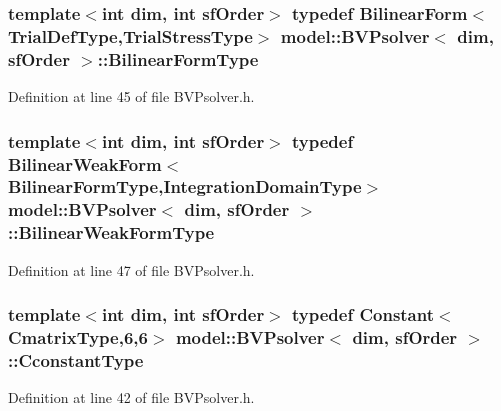 \subsubsection[{Bilinear\+Form\+Type}]{\setlength{\rightskip}{0pt plus 5cm}template$<$int dim, int sf\+Order$>$ typedef {\bf Bilinear\+Form}$<${\bf Trial\+Def\+Type},{\bf Trial\+Stress\+Type}$>$ {\bf model\+::\+B\+V\+Psolver}$<$ {\bf dim}, sf\+Order $>$\+::{\bf Bilinear\+Form\+Type}}\label{classmodel_1_1_b_v_psolver_abf2cbb433fe3755ad102b97e8c0e5797}


Definition at line 45 of file B\+V\+Psolver.\+h.

\hypertarget{classmodel_1_1_b_v_psolver_a06f36ccb87e0ec560ed0f8820527e8a5}{}
\subsubsection[{Bilinear\+Weak\+Form\+Type}]{\setlength{\rightskip}{0pt plus 5cm}template$<$int dim, int sf\+Order$>$ typedef {\bf Bilinear\+Weak\+Form}$<${\bf Bilinear\+Form\+Type},{\bf Integration\+Domain\+Type}$>$ {\bf model\+::\+B\+V\+Psolver}$<$ {\bf dim}, sf\+Order $>$\+::{\bf Bilinear\+Weak\+Form\+Type}}\label{classmodel_1_1_b_v_psolver_a06f36ccb87e0ec560ed0f8820527e8a5}


Definition at line 47 of file B\+V\+Psolver.\+h.

\hypertarget{classmodel_1_1_b_v_psolver_ab9bcff4d15a79d2622265feb7e755aa6}{}
\subsubsection[{Cconstant\+Type}]{\setlength{\rightskip}{0pt plus 5cm}template$<$int dim, int sf\+Order$>$ typedef {\bf Constant}$<${\bf Cmatrix\+Type},6,6$>$ {\bf model\+::\+B\+V\+Psolver}$<$ {\bf dim}, sf\+Order $>$\+::{\bf Cconstant\+Type}}\label{classmodel_1_1_b_v_psolver_ab9bcff4d15a79d2622265feb7e755aa6}


Definition at line 42 of file B\+V\+Psolver.\+h.

\hypertarget{classmodel_1_1_b_v_psolver_a5c38d43773f72a099a19d5e4663e9c20}{}

